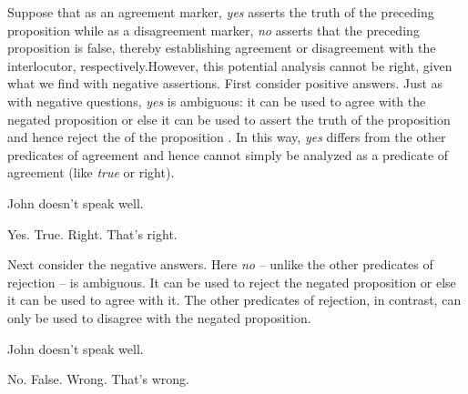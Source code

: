 \documentclass[output=paper]{LSP/langsci}
\begin{document}
Suppose that as an agreement marker, \textit{yes} asserts the truth of the preceding proposition while as a disagreement marker, \textit{no} asserts that the preceding proposition is false, thereby establishing agreement or disagreement with the interlocutor, respectively.\linebreak However, this potential analysis cannot be right, given what we find with negative assertions. First consider positive answers. Just as with negative questions, \textit{yes} is ambiguous: it can be used to agree with the negated proposition or else it can be used to assert the truth of the proposition and hence reject the  of the proposition . In this way, \textit{yes} differs from the other predicates of agreement and hence cannot simply be analyzed as a predicate of agreement (like \textit{true} or right). 


\ea\label{ex:wiltschko:25}
\settowidth{}
\begin{xlist}
  {John doesn’t speak  well.} 
\begin{xlisti}
\ex\label{ex:wiltschko:25i}\relax  
Yes. 
\exi{} 
\ex\relax   True.		     
\ex\relax   Right.		     
\ex\relax   That’s right. 	     
\end{xlisti}
\end{xlist}
\z

Next consider the negative answers. Here \textit{no} – unlike the other predicates of rejection – is ambiguous. It can be used to reject the negated proposition or else it can be used to agree with it. The other predicates of rejection, in contrast, can only be used to disagree with the negated proposition. 


\ea\label{ex:wiltschko:26}
\settowidth{}
\begin{xlist}
 {John doesn’t speak  well.} 
 \begin{xlisti}
\ex\label{ex:wiltschko:26i}  No. 
\exi{} 
\ex  False.        
\ex  Wrong.       
\ex  That’s wrong. 
\end{xlisti}
\end{xlist}
\z
\end{document}

